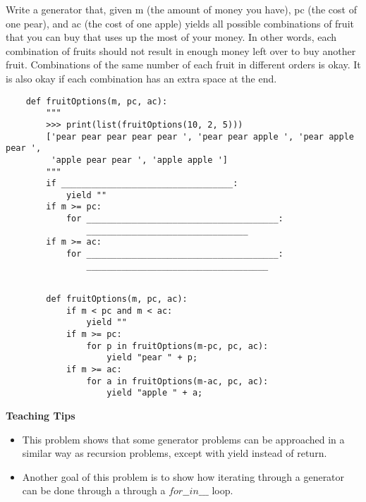 \begin{blocksection}
    \question Write a generator that, given m (the amount of money you have), pc (the cost of one pear), and ac (the cost of one apple)
    yields all possible combinations of fruit that you can buy that uses up the most of your money. In other words, each combination of fruits
    should not result in enough money left over to buy another fruit. Combinations of the same number of each fruit in different orders is okay.
    It is also okay if each combination has an extra space at the end.
    
    \begin{lstlisting}
    def fruitOptions(m, pc, ac):
        """
        >>> print(list(fruitOptions(10, 2, 5)))
        ['pear pear pear pear pear ', 'pear pear apple ', 'pear apple pear ',
         'apple pear pear ', 'apple apple ']
        """
        if __________________________________:
            yield ""
        if m >= pc:
            for ______________________________________:
                ________________________________
        if m >= ac:
            for ______________________________________:
                ____________________________________
                
    \end{lstlisting}
    
    \begin{solution}[1in]
    \begin{lstlisting}
        def fruitOptions(m, pc, ac): 
            if m < pc and m < ac:
                yield ""
            if m >= pc:
                for p in fruitOptions(m-pc, pc, ac):
                    yield "pear " + p;
            if m >= ac:
                for a in fruitOptions(m-ac, pc, ac):
                    yield "apple " + a;    
    \end{lstlisting}
    \end{solution}
    \end{blocksection}
    
    \begin{guide}
    \begin{blocksection}
        \textbf{Teaching Tips}
        \begin{itemize}
        \item This problem shows that some generator problems can be approached in a similar way as recursion problems, except with yield instead of return.
        \item Another goal of this problem is to show how iterating through a generator can be done through a through a $for \_\_ in \_\_\_$ loop.
        \end{itemize}
    \end{blocksection}
    \end{guide}